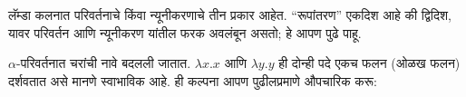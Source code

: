 \documentclass[../../../include/open-logic-section]{subfiles}
\begin{document}

लॅम्डा कलनात परिवर्तनाचे किंवा न्यूनीकरणाचे तीन प्रकार आहेत.
“रूपांतरण” एकदिश आहे की द्विदिश, यावर परिवर्तन आणि
न्यूनीकरण यांतील फरक अवलंबून असतो; हे आपण पुढे पाहू.

$\alpha$-परिवर्तनात चरांची नावे बदलली जातात.
$\lambda x. x$ आणि $\lambda y.y$ ही दोन्ही पदे एकच फलन
(ओळख फलन) दर्शवतात असे मानणे स्वाभाविक आहे.
ही कल्पना आपण पुढीलप्रमाणे औपचारिक करू:
\end{document}
